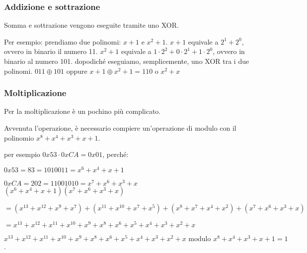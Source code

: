 
\subsubsection{Addizione e sottrazione} %

\textsf{\small Somma e sottrazione vengono eseguite tramite uno XOR.}

\textsf{\small Per esempio: prendiamo due polinomi: $x + 1 \text{ e } x^2 + 1$.}
\textsf{\small $x + 1$ equivale a $2^1 + 2^0$, ovvero in binario il numero 11.}
\textsf{\small $x^2 + 1$ equivale a $1 \cdot 2^2 + 0 \cdot 2^1 + 1 \cdot 2^0$, ovvero in binario al numero 101.}
\textsf{\small dopodiché eseguiamo, semplicemente, uno XOR tra i due polinomi.}
\textsf{\small  $011 \oplus 101$ oppure $x + 1 \oplus x^2 + 1 = 110 \text{ o } x^2 + x$}

\subsubsection{Moltiplicazione}

\textsf{\small Per la moltiplicazione è un pochino più complicato.} %

\textsf{\small Avvenuta l'operazione, è necessario compiere un'operazione di modulo con il polinomio $x^8 + x^4 + x^3 + x + 1$. } %

\textsf{\small per esempio $0x53 \cdot 0xCA = 0x01$, perché: } %

\textsf{\small $0x53 = 83 = 1010011 = x^6 + x^4 + x + 1$}

\textsf{\small $ 0xCA = 202 = 11001010 = x^7 + x^6 + x^3 + x $} \\

\textsf{\small $ (x^6 + x^4 + x + 1)(x^7 + x^6 + x^3 + x) $}

\textsf{\small $ = (x^{13} + x^{12} + x^9 + x^7)  + (x^{11} + x^{10} + x^7 + x^5) + (x^8 + x^7 + x^4 + x^2) + (x^7 + x^6 + x^3 + x)$}

\textsf{\small $ = x^{13} + x^{12} + x^{11} + x^{10} + x^9 + x^8 + x^6 + x^5 + x^4 + x^3 + x^2 + x$}

\textsf{\small $ x^{13} + x^{12} + x^{11} + x^{10} + x^9 + x^8 + x^6 + x^5 + x^4 + x^3 + x^2 + x \text{ modulo } x^8 + x^4 + x^3 + x + 1 = 1$.}

